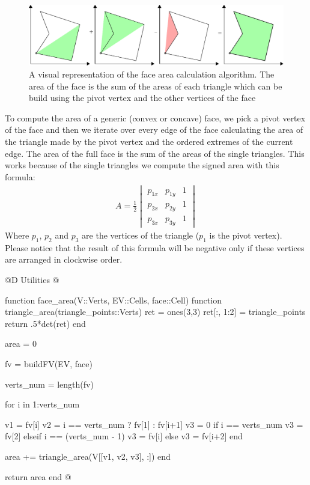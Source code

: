\begin{figure}[h]
    \includegraphics[width=\textwidth]{./img/ch5-area.pdf}
    \caption{A visual representation of the face area calculation algorithm. The area
    of the face is the sum of the areas of each triangle which can be build using the 
    pivot vertex and the other vertices of the face}
\end{figure}
\noindent
To compute the area of a generic (convex or concave) face,
we pick a pivot vertex of the face and then we iterate over
every edge of the face calculating the area of the triangle
made by the pivot vertex and the ordered extremes of the current edge.
The area of the full face is the sum of the areas of the single triangles.
This works because of the single triangles we compute the signed area with
this formula:
\begin{gather*}
    A = \frac{1}{2}
    \begin{vmatrix}
        p_{1x} & p_{1y} & 1 \\
        p_{2x} & p_{2y} & 1 \\
        p_{3x} & p_{3y} & 1
    \end{vmatrix}
\end{gather*}
Where $p_1$, $p_2$ and $p_3$ are the vertices of the triangle ($p_1$ is the pivot vertex). 
Please notice that the result of this formula will be negative only if these vertices 
are arranged in clockwise order.

@D Utilities
@{function face_area(V::Verts, EV::Cells, face::Cell)
    function triangle_area(triangle_points::Verts)
        ret = ones(3,3)
        ret[:, 1:2] = triangle_points
        return .5*det(ret)
    end

    area = 0

    fv = buildFV(EV, face)

    verts_num = length(fv)

    for i in 1:verts_num

        v1 = fv[i]
        v2 = i == verts_num ? fv[1] : fv[i+1]
        v3 = 0
        if i == verts_num
            v3 = fv[2]
        elseif i == (verts_num - 1)
            v3 = fv[i]
        else
            v3 = fv[i+2]
        end
        

        area += triangle_area(V[[v1, v2, v3], :])
    end

    return area
end
@}

